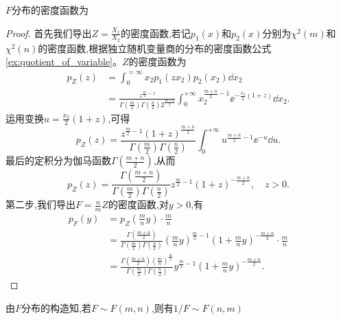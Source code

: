 \begin{proposition}
    $F$分布的密度函数为
\end{proposition}

\begin{proof}
    首先我们导出$Z=\frac{X_1}{X_2}$的密度函数,若记$p_1(x)$和$p_2(x)$分别为$\chi^2(m)$和$\chi^2(n)$的密度函数,根据独立随机变量商的分布的密度函数公式\ref{ex:quotient_of_variable}。$Z$的密度函数为
    \begin{align*}
        p_Z(z) & =\int_0^{=\infty}x_2p_1(zx_2)p_2(x_2)\dd x_2                                                                                                                                       \\
               & =\frac{z^{\frac{m}{2}-1}}{\Gamma \left( \frac{m}{2} \right) \Gamma \left( \frac{n}{2} \right) 2^{\frac{m+n}{2}}}\int_0^{+\infty}x_2^{\frac{m+n}2-1}\ee^{-\frac{x_2}2(1+z)}\dd x_2.
    \end{align*}
    运用变换$u=\frac{x_2}2(1+z)$,可得
    \[p_Z(z)=\frac{z^{\frac{m}{2}-1}\left( 1+z \right) ^{\frac{m+n}{2}}}{\Gamma \left( \frac{m}{2} \right) \Gamma \left( \frac{n}{2} \right)}\int_0^{+\infty}u^{\frac{m+n}2-1}\ee^{-u}\dd u.\]
    最后的定积分为伽马函数$\Gamma\left(\frac{m+n}2\right)$,从而
    \[
        p_Z\left( z \right) =\frac{\Gamma \left( \frac{m+n}{2} \right)}{\Gamma \left( \frac{m}{2} \right) \Gamma \left( \frac{n}{2} \right)}z^{\frac{m}{2}-1}\left( 1+z \right) ^{-\frac{m+n}{2}},\quad z>0.
    \]
    第二步,我们导出$F=\frac nm Z$的密度函数,对$y>0$,有
    \begin{align*}
        p_F\left( y \right) & =p_Z\left( \frac{m}{n}y \right) \cdot \frac{m}{n}                                                                                                                                                                            \\
                            & =\frac{\Gamma \left( \frac{m+n}{2} \right)}{\Gamma \left( \frac{m}{2} \right) \Gamma \left( \frac{n}{2} \right)}\left( \frac{m}{n}y \right) ^{\frac{m}{2}-1}\left( 1+\frac{m}{n}y \right) ^{-\frac{m+n}{2}}\cdot \frac{m}{n} \\
                            & =\frac{\Gamma \left( \frac{m+n}{2} \right) \left( \frac{m}{n} \right) ^{\frac{m}{2}}}{\Gamma \left( \frac{m}{2} \right) \Gamma \left( \frac{n}{2} \right)}y^{\frac{m}{2}-1}\left( 1+\frac{m}{n}y \right) ^{-\frac{m+n}{2}}.
    \end{align*}
\end{proof}

\begin{remark}
    由$F$分布的构造知,若$F\sim F(m,n)$,则有$1/F\sim F(n,m)$
\end{remark}

